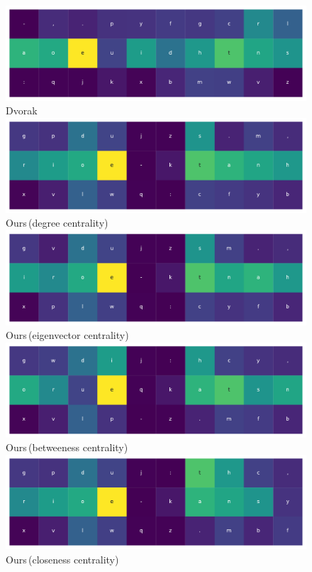 \documentclass[9pt,twocolumn,twoside]{pnas-report}
\begin{document}
\begin{figure}\centering%
    \includegraphics[width=0.8\linewidth]{fig/dvorak}\\
    \small{Dvorak}
    \vskip5pt
    \includegraphics[width=0.8\linewidth]{fig/degree}\\
    \small{Ours\,(degree centrality)}
    \vskip5pt
    \includegraphics[width=0.8\linewidth]{fig/eigenvector}\\
    \small{Ours\,(eigenvector centrality)}
    \vskip5pt
    \includegraphics[width=0.8\linewidth]{fig/betweenness}\\
    \small{Ours\,(betweeness centrality)}
    \vskip5pt
    \includegraphics[width=0.8\linewidth]{fig/closeness}\\
    \small{Ours\,(closeness centrality)}

\end{figure}
\end{document}

